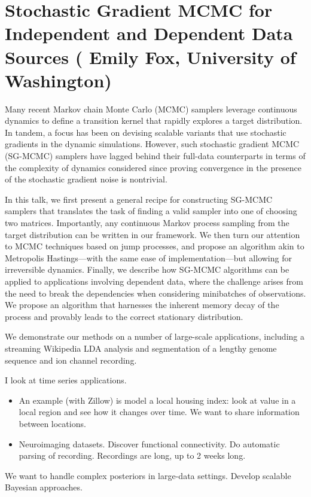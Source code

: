 \section{Stochastic Gradient MCMC for Independent and Dependent Data Sources ( 
Emily Fox, University of Washington)}

Many recent Markov chain Monte Carlo (MCMC) samplers leverage continuous dynamics to define a transition kernel that rapidly explores a target distribution. In tandem, a focus has been on devising scalable variants that use stochastic gradients in the dynamic simulations. However, such stochastic gradient MCMC (SG-MCMC) samplers have lagged behind their full-data counterparts in terms of the complexity of dynamics considered since proving convergence in the presence of the stochastic gradient noise is nontrivial.
 
In this talk, we first present a general recipe for constructing SG-MCMC samplers that translates the task of finding a valid sampler into one of choosing two matrices.  Importantly, any continuous Markov process sampling from the target distribution can be written in our framework.  We then turn our attention to MCMC techniques based on jump processes, and propose an algorithm akin to Metropolis Hastings---with the same ease of implementation---but allowing for irreversible dynamics.  Finally, we describe how SG-MCMC algorithms can be applied to applications involving dependent data, where the challenge arises from the need to break the dependencies when considering minibatches of observations.  We propose an algorithm that harnesses the inherent memory decay of the process and provably leads to the correct stationary distribution.
 
We demonstrate our methods on a number of large-scale applications, including a streaming Wikipedia LDA analysis and segmentation of a lengthy genome sequence and ion channel recording.

I look at time series applications. 
\begin{itemize}
\item
An example (with Zillow) is model a local housing index: look at value in a local region and see how it changes over time. We want to share information between locations.
\item
Neuroimaging datasets.
Discover functional connectivity. Do automatic parsing of recording. Recordings are long, up to 2 weeks long.
\end{itemize}

We want to handle complex posteriors in large-data settings. Develop scalable Bayesian approaches.

